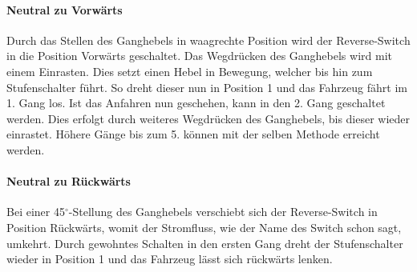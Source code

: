 \paragraph{Neutral zu Vorwärts}
Durch das Stellen des Ganghebels in waagrechte Position wird der Reverse-Switch in die Position Vorwärts geschaltet. Das Wegdrücken des Ganghebels wird mit einem Einrasten. Dies setzt einen Hebel in Bewegung, welcher bis hin zum Stufenschalter führt. So dreht dieser nun in Position 1 und das Fahrzeug fährt im 1. Gang los. Ist das Anfahren nun geschehen, kann in den 2. Gang geschaltet werden. Dies erfolgt durch weiteres Wegdrücken des Ganghebels, bis dieser wieder einrastet. Höhere Gänge bis zum 5. können mit der selben Methode erreicht werden.

\paragraph{Neutral zu Rückwärts}
Bei einer 45$^\circ$-Stellung des Ganghebels verschiebt sich der Reverse-Switch in Position Rückwärts, womit der Stromfluss, wie der Name des Switch schon sagt, umkehrt. Durch gewohntes Schalten in den ersten Gang dreht der Stufenschalter wieder in Position 1 und das Fahrzeug lässt sich rückwärts lenken.